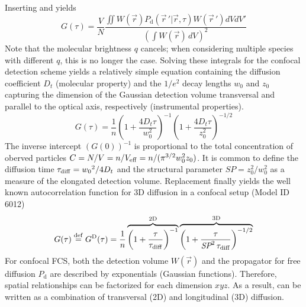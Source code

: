 Inserting  and  yields
	\begin{equation}
	\label{eq8}
	G(\tau) = \frac{V}{N} \frac{\iint W(\vec{r}) P_\mathrm{d} \left( \vec{r} \,' | \vec{r},\tau \right) W(\vec{r} \,') dVdV'}{\left( \int W(\vec{r}) \,dV \right)^2}
	\end{equation}
Note that the molecular brightness $q$ cancels; when considering multiple species with different $q$, this is no longer the case.
Solving these integrals for the confocal detection scheme yields a relatively simple equation containing the diffusion coefficient $D_t$ (molecular property) and the $1/e^2$ decay lengths $w_0$ and $z_0$ capturing the dimension of the Gaussian detection volume transversal and parallel to the optical axis, respectively (instrumental properties).
	\begin{equation}
	\label{eq9}
	G(\tau) = \frac{1}{n} \left(1+\frac{4 D_t \tau}{w_0^2} \right) ^{-1} \left(1+\frac{4D_t \tau}{z_0^2} \right)^{-1/2}
	\end{equation}
The inverse intercept $(G(0))^{-1}$ is proportional to the total concentration of oberved particles $C = N/V =  n/V_{\rm eff} = n/ (\pi^{3/2}w_0^2z_0)$. It is common to define the diffusion time $\tau_{\rm diff} = {w_0}^2/4D_t$ and the structural parameter $\textit{SP}=z_0^2/w_0^2$ as a measure of the elongated detection volume. Replacement finally yields the well known autocorrelation function for 3D diffusion in a confocal setup (Model ID 6012)
	\begin{equation}
	\label{eq10}
	G(\tau) \stackrel{\rm def}{=} G^{\rm D}(\tau) = \frac{1}{n} \overbrace{ \left(1+\frac{\tau}{\tau_{\rm {diff}}} \right) ^{-1}}^{\rm 2D} \overbrace{ \left(1+\frac{\tau}{\textit{SP}^2 \, \tau_{\rm {diff}}} \right)^{-1/2}}^{\rm 3D}
	\end{equation}
For confocal FCS, both the detection volume $W(\vec{r})$ and the propagator for free diffusion $P_\mathrm{d}$ are described by exponentials (Gaussian functions). Therefore, spatial relationships can be factorized for each dimension $xyz$. As a result,  can be written as a combination of transversal (2D) and longitudinal (3D) diffusion.

